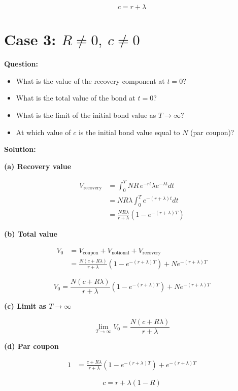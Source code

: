 \documentclass{article}
\begin{document}
\[
\boxed{c = r + \lambda}
\]


\section*{Case 3: $R \neq 0,\ c \neq 0$}

\textbf{Question:}
\begin{itemize}
    \item[(a)] What is the value of the recovery component at $t = 0$?
    \item[(b)] What is the total value of the bond at $t = 0$?
    \item[(c)] What is the limit of the initial bond value as $T \to \infty$?
    \item[(d)] At which value of $c$ is the initial bond value equal to $N$ (par coupon)?
\end{itemize}

\vspace{4pt}

\textbf{Solution:}

\textbf{(a) Recovery value}

\begin{align*}
V_{\text{recovery}}
&= \int_0^T NR \, e^{-rt} \lambda e^{-\lambda t} dt \\
&= NR \lambda \int_0^T e^{-(r+\lambda)t} dt \\
&= \frac{NR\lambda}{r+\lambda}\left(1 - e^{-(r+\lambda)T}\right)
\end{align*}

\textbf{(b) Total value}

\begin{align*}
V_0
&= V_{\text{coupon}} + V_{\text{notional}} + V_{\text{recovery}} \\
&= \frac{N(c + R\lambda)}{r+\lambda}\left(1 - e^{-(r+\lambda)T}\right)
+ N e^{-(r+\lambda)T}
\end{align*}

\[
\boxed{
V_0 =
\frac{N(c + R\lambda)}{r+\lambda}\left(1 - e^{-(r+\lambda)T}\right)
+ N e^{-(r+\lambda)T}
}
\]

\textbf{(c) Limit as $T \to \infty$}

\[
\boxed{
\lim_{T \to \infty} V_0 = \frac{N(c + R\lambda)}{r+\lambda}
}
\]

\textbf{(d) Par coupon}

\begin{align*}
1
&= \frac{c + R\lambda}{r+\lambda}\left(1 - e^{-(r+\lambda)T}\right)
+ e^{-(r+\lambda)T}
\end{align*}

\[
\boxed{c = r + \lambda(1 - R)}
\]
\end{document}
